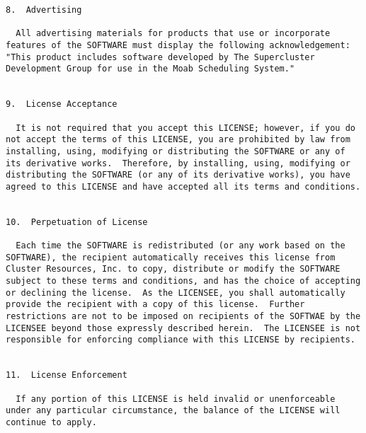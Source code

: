\begin{verbatim}
8.  Advertising

  All advertising materials for products that use or incorporate
features of the SOFTWARE must display the following acknowledgement:
"This product includes software developed by The Supercluster
Development Group for use in the Moab Scheduling System."


9.  License Acceptance

  It is not required that you accept this LICENSE; however, if you do
not accept the terms of this LICENSE, you are prohibited by law from
installing, using, modifying or distributing the SOFTWARE or any of
its derivative works.  Therefore, by installing, using, modifying or
distributing the SOFTWARE (or any of its derivative works), you have
agreed to this LICENSE and have accepted all its terms and conditions.


10.  Perpetuation of License

  Each time the SOFTWARE is redistributed (or any work based on the
SOFTWARE), the recipient automatically receives this license from
Cluster Resources, Inc. to copy, distribute or modify the SOFTWARE
subject to these terms and conditions, and has the choice of accepting
or declining the license.  As the LICENSEE, you shall automatically
provide the recipient with a copy of this license.  Further
restrictions are not to be imposed on recipients of the SOFTWAE by the
LICENSEE beyond those expressly described herein.  The LICENSEE is not
responsible for enforcing compliance with this LICENSE by recipients.


11.  License Enforcement 

  If any portion of this LICENSE is held invalid or unenforceable
under any particular circumstance, the balance of the LICENSE will
continue to apply.
\end{verbatim}
